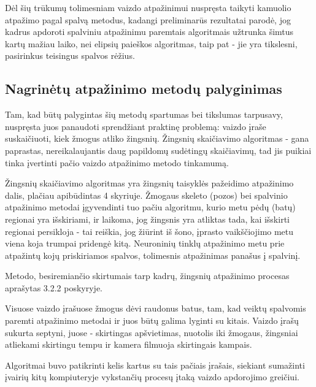 \documentclass{VUMIFPSbakalaurinis}
\begin{document}
Dėl šių trūkumų tolimesniam vaizdo atpažinimui nuspręsta taikyti kamuolio atpažimo pagal spalvą metodus, kadangi preliminarūs rezultatai parodė, jog kadrus apdoroti spalviniu atpažinimu paremtais algoritmais užtrunka šimtus kartų mažiau laiko, nei elipsių paieškos algoritmas, taip pat - jie yra tikslesni, pasirinkus teisingus spalvos rėžius. 

\subsection{Nagrinėtų atpažinimo metodų palyginimas}

Tam, kad būtų palygintas šių metodų spartumas bei tikslumas tarpusavy, nuspręsta juos panaudoti sprendžiant praktinę problemą: vaizdo įraše suskaičiuoti, kiek žmogus atliko žingsnių. Žingsnių skaičiavimo algoritmas - gana paprastas, nereikalaujantis daug papildomų sudėtingų skaičiavimų, tad jis puikiai tinka įvertinti pačio vaizdo atpažinimo metodo tinkamumą.  

Žingsnių skaičiavimo algoritmas yra žingsnių taisyklės pažeidimo atpažinimo dalis, plačiau apibūdintas 4 skyriuje. Žmogaus skeleto (pozos) bei spalvinio atpažinimo metodai įgyvendinti tuo pačiu algoritmu, kurio metu pėdų (batų) regionai yra išskiriami, ir laikoma, jog žingsnis yra atliktas tada, kai išskirti regionai persikloja - tai reiškia, jog žiūrint iš šono, įprasto vaikščiojimo metu viena koja trumpai pridengė kitą. Neuroninių tinklų atpažinimo metu prie atpažintų kojų priskiriamos spalvos, tolimesnis atpažinimas panašus į spalvinį.

Metodo, besiremiančio skirtumais tarp kadrų, žingsnių atpažinimo procesas aprašytas 3.2.2 poskyryje.

Visuose vaizdo įrašuose žmogus dėvi raudonus batus, tam, kad veiktų spalvomis paremti atpažinimo metodai ir juos būtų galima lyginti su kitais. Vaizdo įrašų sukurta septyni, juose - skirtingas apšvietimas, nuotolis iki žmogaus, žingsniai atliekami skirtingu tempu ir kamera filmuoja skirtingais kampais. 

Algoritmai buvo patikrinti kelis kartus su tais pačiais įrašais, siekiant sumažinti įvairių kitų kompiuteryje vykstančių procesų įtaką vaizdo apdorojimo greičiui. 
\end{document}
